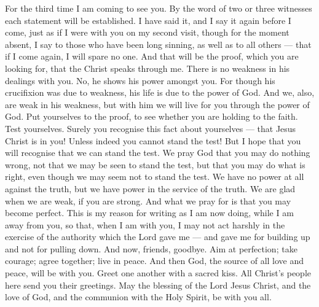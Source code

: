  For the third time I am coming to see you. By the word of
two or three witnesses each statement will be established. 
I have said it, and I say it again before I come, just as if I were with
you on my second visit, though for the moment absent, I say to those who
have been long sinning, as well as to all others --- that if I come
again, I will spare no one.  And that will be the proof,
which you are looking for, that the Christ speaks through me. There is
no weakness in his dealings with you. No, he shows his power amongst
you.  For though his crucifixion was due to weakness, his
life is due to the power of God. And we, also, are weak in his weakness,
but with him we will live for you through the power of God. 
Put yourselves to the proof, to see whether you are holding to the
faith. Test yourselves. Surely you recognise this fact about yourselves
--- that Jesus Christ is in you! Unless indeed you cannot stand the
test!  But I hope that you will recognise that we can stand
the test.  We pray God that you may do nothing wrong, not
that we may be seen to stand the test, but that you may do what is
right, even though we may seem not to stand the test.  We
have no power at all against the truth, but we have power in the service
of the truth.  We are glad when we are weak, if you are
strong. And what we pray for is that you may become perfect.
 This is my reason for writing as I am now doing, while I
am away from you, so that, when I am with you, I may not act harshly in
the exercise of the authority which the Lord gave me --- and gave me for
building up and not for pulling down.  And now, friends,
goodbye. Aim at perfection; take courage; agree together; live in peace.
And then God, the source of all love and peace, will be with you.
 Greet one another with a sacred kiss.  All
Christ's people here send you their greetings.  May the
blessing of the Lord Jesus Christ, and the love of God, and the
communion with the Holy Spirit, be with you all.
